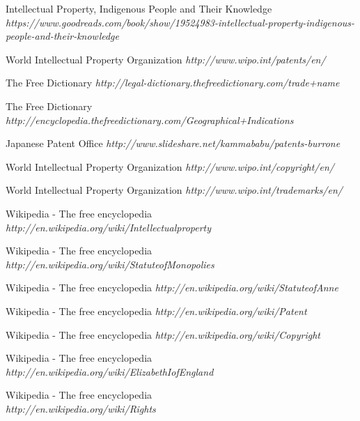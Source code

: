 \documentclass[a4paper,11pt]{article}
\begin{document}
\begin{thebibliography}{14}

 Intellectual Property, Indigenous People and Their Knowledge
\textit{https://www.goodreads.com/book/show/19524983-intellectual-property-indigenous-people-and-their-knowledge}

 World Intellectual Property Organization
\textit{http://www.wipo.int/patents/en/}

 The Free Dictionary
\textit{http://legal-dictionary.thefreedictionary.com/trade+name}

 The Free Dictionary
\textit{http://encyclopedia.thefreedictionary.com/Geographical+Indications}

 Japanese Patent Office
\textit{http://www.slideshare.net/kammababu/patents-burrone} 

 World Intellectual Property Organization
\textit{http://www.wipo.int/copyright/en/}

 World Intellectual Property Organization
\textit{http://www.wipo.int/trademarks/en/}

 Wikipedia - The free encyclopedia
\textit{http://en.wikipedia.org/wiki/Intellectual\textunderscore property}

 Wikipedia - The free encyclopedia
\textit{http://en.wikipedia.org/wiki/Statute\textunderscore of\textunderscore Monopolies}

 Wikipedia - The free encyclopedia
\textit{http://en.wikipedia.org/wiki/Statute\textunderscore of\textunderscore Anne}

 Wikipedia - The free encyclopedia
\textit{http://en.wikipedia.org/wiki/Patent}

 Wikipedia - The free encyclopedia
\textit{http://en.wikipedia.org/wiki/Copyright}

 Wikipedia - The free encyclopedia
\textit{http://en.wikipedia.org/wiki/Elizabeth\textunderscore I\textunderscore of\textunderscore England}

 Wikipedia - The free encyclopedia \\
\textit{http://en.wikipedia.org/wiki/Rights}

\end{thebibliography}
\end{document}
